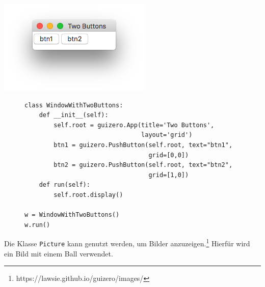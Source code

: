 \documentclass{tufte-handout}
\begin{document}
\begin{marginfigure}
	\begin{center}
		\includegraphics[width=\textwidth]{../with_2_buttons.png}
	\end{center}	
\end{marginfigure}

\begin{figure}
\begin{lstlisting}
class WindowWithTwoButtons:
    def __init__(self):
        self.root = guizero.App(title='Two Buttons', 
                                layout='grid')
        btn1 = guizero.PushButton(self.root, text="btn1",
                                  grid=[0,0])
        btn2 = guizero.PushButton(self.root, text="btn2",
                                  grid=[1,0])
    def run(self):
        self.root.display()

w = WindowWithTwoButtons()
w.run()

\end{lstlisting}
\end{figure} 

Die Klasse \lstinline|Picture| kann genutzt werden, um Bilder
anzuzeigen.\footnote{
	https://lawsie.github.io/guizero/images/} Hierfür wird ein
Bild mit einem Ball verwendet.
\end{document}
